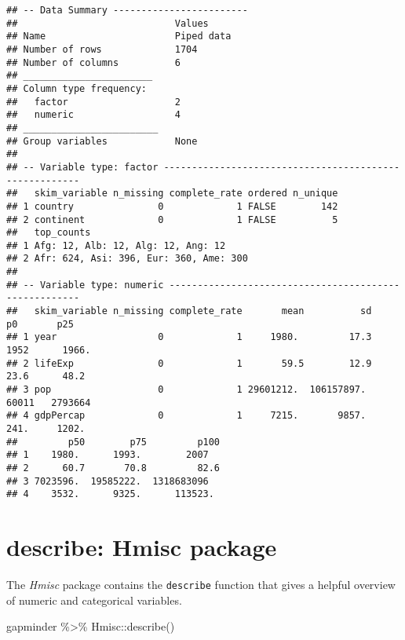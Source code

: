 \documentclass[
]{book}
\newenvironment{Shaded}{\begin{snugshade}}{\end{snugshade}}
\newcommand{\FunctionTok}[1]{\textcolor[rgb]{0.00,0.00,0.00}{#1}}
\newcommand{\NormalTok}[1]{#1}
\newcommand{\SpecialCharTok}[1]{\textcolor[rgb]{0.00,0.00,0.00}{#1}}
\begin{document}
\begin{verbatim}
## -- Data Summary ------------------------
##                            Values    
## Name                       Piped data
## Number of rows             1704      
## Number of columns          6         
## _______________________              
## Column type frequency:               
##   factor                   2         
##   numeric                  4         
## ________________________             
## Group variables            None      
## 
## -- Variable type: factor -------------------------------------------------------
##   skim_variable n_missing complete_rate ordered n_unique
## 1 country               0             1 FALSE        142
## 2 continent             0             1 FALSE          5
##   top_counts                            
## 1 Afg: 12, Alb: 12, Alg: 12, Ang: 12    
## 2 Afr: 624, Asi: 396, Eur: 360, Ame: 300
## 
## -- Variable type: numeric ------------------------------------------------------
##   skim_variable n_missing complete_rate       mean          sd      p0       p25
## 1 year                  0             1     1980.         17.3  1952      1966. 
## 2 lifeExp               0             1       59.5        12.9    23.6      48.2
## 3 pop                   0             1 29601212.  106157897.  60011   2793664  
## 4 gdpPercap             0             1     7215.       9857.    241.     1202. 
##         p50        p75         p100
## 1    1980.      1993.        2007  
## 2      60.7       70.8         82.6
## 3 7023596.  19585222.  1318683096  
## 4    3532.      9325.      113523.
\end{verbatim}

\hypertarget{describe-hmisc-package}{%
\section{describe: Hmisc package}\label{describe-hmisc-package}}

The \emph{Hmisc} package contains the \texttt{describe} function that gives a helpful overview of numeric and categorical variables.

\begin{Shaded}
\begin{Highlighting}[]
\NormalTok{gapminder }\SpecialCharTok{\%\textgreater{}\%} 
\NormalTok{  Hmisc}\SpecialCharTok{::}\FunctionTok{describe}\NormalTok{() }
\end{Highlighting}
\end{Shaded}
\end{document}
